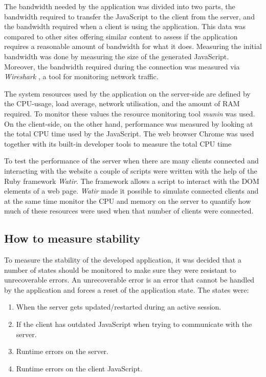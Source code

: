 \documentclass[a4paper]{article}
\begin{document}
The bandwidth needed by the application was divided into two parts, the bandwidth required to transfer the JavaScript to the client from the server, and the bandwidth required when a client is using the application. This data was compared to other sites offering similar content to assess if the application requires a reasonable amount of bandwidth for what it does. Measuring the initial bandwidth was done by measuring the size of the generated JavaScript. Moreover, the bandwidth required during the connection was measured via \textit{Wireshark} \cite{wireshark-website}, a tool for monitoring network traffic.

The system resources used by the application on the server-side are defined by the CPU-usage, load average, network utilisation, and the amount of RAM required. To monitor these values the resource monitoring tool \textit{munin} \cite{munin-website} was used. On the client-side, on the other hand, performance was measured by looking at the total CPU time used by the JavaScript.  The web browser Chrome was used together with its built-in developer tools to measure the total CPU time

To test the performance of the server when there are many clients connected and interacting with the website a couple of scripts were written with the help of the Ruby framework \textit{Watir}. The framework allows a script to interact with the DOM elements of a web page. \textit{Watir} made it possible to simulate connected clients and at the same time monitor the CPU and memory on the server to quantify how much of these resources were used when that number of clients were connected.

\subsection{How to measure stability}

To measure the stability of the developed application, it was decided that a number of states should be monitored to make sure they were resistant to unrecoverable errors. An unrecoverable error is an error that cannot be handled by the application and forces a reset of the application state. The states were: 
\begin{enumerate}[noitemsep]
    \item When the server gets updated/restarted during an active session.
    \item If the client has outdated JavaScript when trying to communicate with the server.
    \item Runtime errors on the server.
    \item Runtime errors on the client JavaScript.\\
\end{enumerate}
\end{document}
